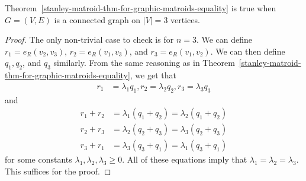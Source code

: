 \documentclass{puthesis-UG}
\begin{document}
\begin{lem} \label{lem:base-case}
	Theorem~\ref{stanley-matroid-thm-for-graphic-matroids-equality} is true when $G = (V, E)$ is a connected graph on $|V| = 3$ vertices. 
\end{lem}

\begin{proof}
	The only non-trivial case to check is for $n = 3$. We can define $r_1 = e_R(v_2, v_3)$, $r_2 = e_R(v_1, v_3)$, and $r_3 = e_R(v_1, v_2)$. We can then define $q_1, q_2$, and $q_3$ similarly. From the same reasoning as in Theorem~\ref{stanley-matroid-thm-for-graphic-matroids-equality}, we get that
	\begin{align*}
		r_1 & = \lambda_1 q_1,  r_2 = \lambda_2 q_2, r_3 = \lambda_3 q_3 
	\end{align*}
	and 
	\begin{align*}
		r_1 + r_2 & = \lambda_1 (q_1 + q_2) = \lambda_2 (q_1 + q_2) \\
		r_2 + r_3 & = \lambda_2 (q_2 + q_3) = \lambda_3 (q_2 + q_3) \\
		r_3 + r_1 & = \lambda_3 (q_3 + q_1) = \lambda_1 (q_3 + q_1)
	\end{align*}
	for some constants $\lambda_1, \lambda_2, \lambda_3 \geq 0$. All of these equations imply that $\lambda_1 = \lambda_2 = \lambda_3$. This suffices for the proof. 
\end{proof}


\end{document}
